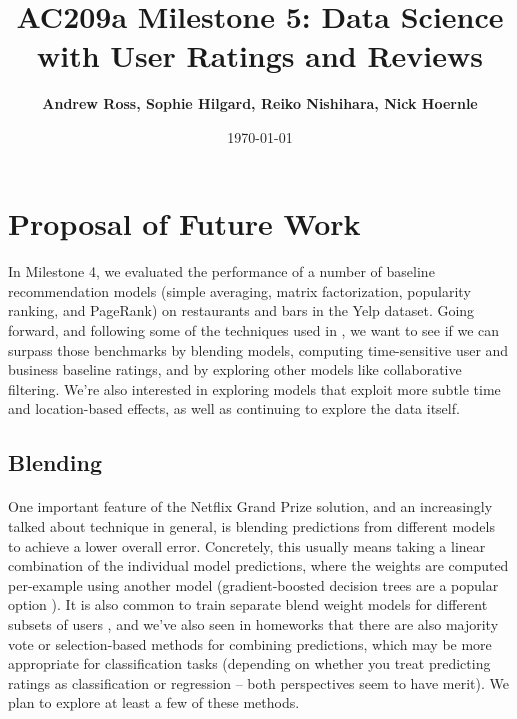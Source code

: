 \documentclass[11pt]{article}
\title{
\vspace{1cm}
\textmd{\textbf{AC209a Milestone 5: Data Science with User Ratings and Reviews}}\\
}
\author{\textbf{Andrew Ross, Sophie Hilgard, Reiko Nishihara, Nick Hoernle}}
\date{\today} %
\begin{document}
\maketitle

\section*{Proposal of Future Work}

\paragraph{} In Milestone 4, we evaluated the performance of a number of baseline recommendation models (simple averaging, matrix factorization, popularity ranking, and PageRank) on restaurants and bars in the Yelp dataset. Going forward, and following some of the techniques used in \cite{koren}, we want to see if we can surpass those benchmarks by blending models, computing time-sensitive user and business baseline ratings, and by exploring other models like collaborative filtering. We're also interested in exploring models that exploit more subtle time and location-based effects, as well as continuing to explore the data itself.

\subsection*{Blending}

\paragraph{} One important feature of the Netflix Grand Prize solution, and an increasingly talked about technique in general, is blending predictions from different models to achieve a lower overall error. Concretely, this usually means taking a linear combination of the individual model predictions, where the weights are computed per-example using another model (gradient-boosted decision trees are a popular option \cite{koren,jahrer}). It is also common to train separate blend weight models for different subsets of users \cite{jahrer}, and we've also seen in homeworks that there are also majority vote or selection-based methods for combining predictions, which may be more appropriate for classification tasks (depending on whether you treat predicting ratings as classification or regression -- both perspectives seem to have merit). We plan to explore at least a few of these methods.
\end{document}
